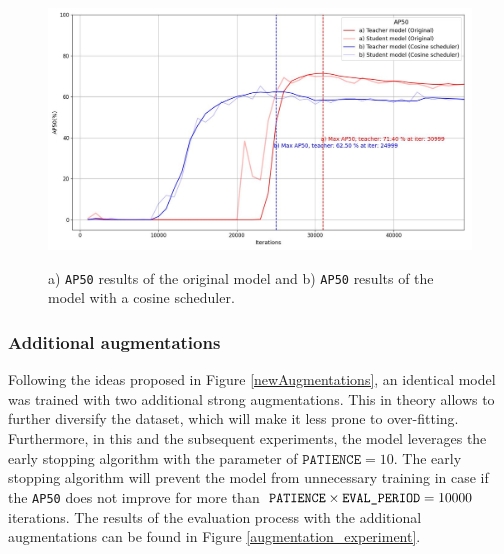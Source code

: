 \begin{figure}[htb]
	\begin{center}
		\includegraphics[width=14cm]{./AP50_scheduler.jpg}
	\end{center}
	\caption{a) \texttt{AP50} results of the original model and b) \texttt{AP50} results of the model with a cosine scheduler.}
	\begin{center}
		\label{comparison_1}
	\end{center}
\end{figure}
\FloatBarrier

\subsubsection{Additional augmentations}
\label{augmentations_section} 
Following the ideas proposed in Figure \ref{newAugmentations}, an identical model was trained with two additional strong augmentations. This in theory allows to further diversify the dataset, which will make it less prone to over-fitting. Furthermore, in this and the subsequent  experiments, the model leverages the early stopping algorithm with the parameter of $\texttt{PATIENCE} = 10$. The early stopping algorithm will prevent the model from unnecessary training in case if the \texttt{AP50} does not improve for more than $\texttt{PATIENCE} \times \texttt{EVAL\textunderscore PERIOD} = 10 000$ iterations. The results of the evaluation process with the additional augmentations can be found in Figure \ref{augmentation_experiment}. 
 
